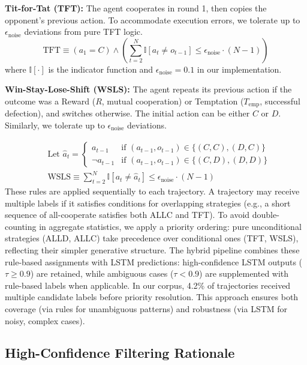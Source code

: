 \documentclass{article}
\begin{document}
\textbf{Tit-for-Tat (TFT):} The agent cooperates in round 1, then copies the opponent's previous action. To accommodate execution errors, we tolerate up to $\epsilon_{\text{noise}}$ deviations from pure TFT logic.
\[
\text{TFT} \equiv (a_1 = C) \land \left(\sum_{t=2}^{N} \mathbb{I}[a_t \neq o_{t-1}] \leq \epsilon_{\text{noise}} \cdot (N-1)\right)
\]
where $\mathbb{I}[\cdot]$ is the indicator function and $\epsilon_{\text{noise}} = 0.1$ in our implementation.

\textbf{Win-Stay-Lose-Shift (WSLS):} The agent repeats its previous action if the outcome was a Reward ($R$, mutual cooperation) or Temptation ($T_{\text{emp}}$, successful defection), and switches otherwise. The initial action can be either $C$ or $D$. Similarly, we tolerate up to $\epsilon_{\text{noise}}$ deviations.

\begin{equation*}
\begin{split}
& \text{Let } \hat{a}_t = 
    \begin{cases} 
        a_{t-1} & \text{if } (a_{t-1}, o_{t-1}) \in \{(C,C), (D,C)\} \\ 
        \neg a_{t-1} & \text{if } (a_{t-1}, o_{t-1}) \in \{(C,D), (D,D)\} 
    \end{cases} \\
& \text{WSLS} \equiv \sum_{t=2}^{N} \mathbb{I}\left[a_t \neq \hat{a}_t\right] \leq \epsilon_{\text{noise}} \cdot (N-1)
\end{split}
\end{equation*}
These rules are applied sequentially to each trajectory. A trajectory may receive multiple labels if it satisfies conditions for overlapping strategies (e.g., a short sequence of all-cooperate satisfies both ALLC and TFT). To avoid double-counting in aggregate statistics, we apply a priority ordering: pure unconditional strategies (ALLD, ALLC) take precedence over conditional ones (TFT, WSLS), reflecting their simpler generative structure. The hybrid pipeline combines these rule-based assignments with LSTM predictions: high-confidence LSTM outputs ($\tau \ge 0.9$) are retained, while ambiguous cases ($\tau < 0.9$) are supplemented with rule-based labels when applicable. In our corpus, 4.2\% of trajectories received multiple candidate labels before priority resolution. This approach ensures both coverage (via rules for unambiguous patterns) and robustness (via LSTM for noisy, complex cases).

\subsection{High-Confidence Filtering Rationale}
\label{appendix:filtering_rationale}
\end{document}
